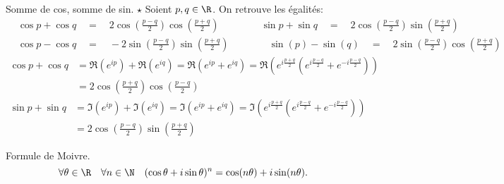 \documentclass[11pt]{article}
\begin{document}
\begin{ex}{Somme de cos, somme de sin. $\star$}{}
    Soient $p,q\in\R$. On retrouve les égalités:
    \begin{align*}
        &\cos p+\cos q\quad=\quad2\cos\left( \frac{p-q}{2} \right)\cos\left( \frac{p+q}{2} \right) \qquad\qquad~ \sin p+\sin q\quad=\quad2\cos\left( \frac{p-q}{2} \right)\sin\left( \frac{p+q}{2} \right)\\
        &\cos p-\cos q\quad=\quad-2\sin\left( \frac{p-q}{2} \right)\sin\left( \frac{p+q}{2} \right)\qquad\qquad \sin(p)-\sin(q)\quad=\quad2\sin\left( \frac{p-q}{2} \right)\cos\left( \frac{p+q}{2} \right)
    \end{align*}
    \tcblower
    \begin{align*}
        \cos p + \cos q &= \Re(e^{ip})+\Re(e^{iq})=\Re(e^{ip}+e^{iq})=\Re\left(e^{i\frac{p+q}{2}}\left( e^{i\frac{p-q}{2}} + e^{-i\frac{p-q}{2}} \right)\right)\\
        &=2\cos\left( \frac{p+q}{2} \right)\cos\left( \frac{p-q}{2} \right)
    \end{align*}
    \begin{align*}
        \sin p + \sin q &= \Im(e^{ip})+\Im(e^{iq})=\Im(e^{ip}+e^{iq})=\Im\left(e^{i\frac{p+q}{2}}\left( e^{i\frac{p-q}{2}} + e^{-i\frac{p-q}{2}} \right)\right)\\
        &=2\cos\left( \frac{p-q}{2} \right)\sin\left( \frac{p+q}{2} \right)
    \end{align*}
\end{ex}

\begin{prop}{Formule de Moivre.}{}
    \begin{equation*}
        \forall \theta \in \R\quad \forall n \in \N\quad (\cos\theta+i\sin\theta)^n=\cos(n\theta)+i\sin(n\theta).
    \end{equation*}
\end{prop}
\end{document}
